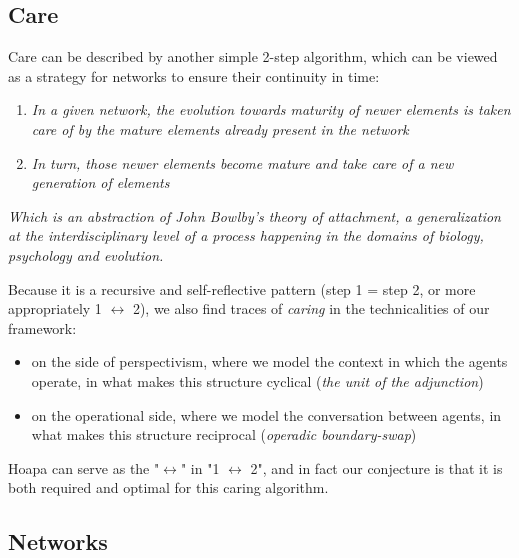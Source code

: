 \documentclass[11pt]{article}
\begin{document}
\subsection{Care}

Care can be described by another simple 2-step algorithm, which can be viewed as a strategy for networks to ensure their continuity in time:

\begin{enumerate}

\item \emph{In a given network, the evolution towards maturity of newer elements is taken care of by the mature elements already present in the network}

\item \emph{In turn, those newer elements become mature and take care of a new generation of elements}

\end{enumerate}

\emph{Which is an abstraction of John Bowlby's theory of attachment, a generalization at the interdisciplinary level of a process happening in the domains of biology, psychology and evolution.}

Because it is a recursive and self-reflective pattern (step 1 = step 2, or more appropriately 1 \ensuremath{\leftrightarrow} 2), we also find traces of \emph{caring} in the technicalities of our framework:

\begin{itemize}

\item on the side of perspectivism, where we model the context in which the agents operate, in what makes this structure cyclical (\emph{the unit of the adjunction})

\item on the operational side, where we model the conversation between agents, in what makes this structure reciprocal (\emph{operadic boundary-swap})

\end{itemize}

Hoapa can serve as the "\ensuremath{\leftrightarrow}" in "1 \ensuremath{\leftrightarrow} 2", and in fact our conjecture is that it is both required and optimal for this caring algorithm.

\subsection{Networks}
\end{document}
